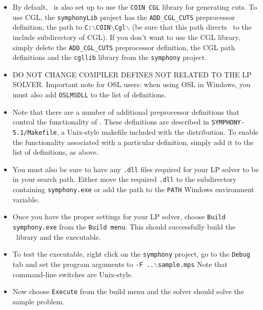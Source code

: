 \begin{itemize}
\begin{itemize}
\end{itemize}

\item By default, \BB\ is also set up to use the \texttt{COIN CGL} library for
generating cuts. To use CGL, the \texttt{symphonyLib} project has the
\texttt{ADD\_CGL\_CUTS} preprocessor definition, the path to
\texttt{C:$\backslash$COIN$\backslash$Cgl$\backslash$} (be sure that this path
directs \BB\ to the include subdirectory of CGL). If you don't want to use the 
CGL library, simply
delete the \texttt{ADD\_CGL\_CUTS} preprocessor definition, the CGL path
definitions and the \texttt{cgllib} library from the \texttt{symphony}
project.

\item DO NOT CHANGE COMPILER DEFINES NOT RELATED TO THE LP SOLVER. Important 
note for OSL users: when using OSL in Windows, you must also add 
\texttt{OSLMSDLL} to the list of definitions.

\item Note that there are a number of additional preprocessor definitions that
control the functionality of \BB. These definitions are described in
\texttt{SYMPHONY-5.1/Makefile}, a Unix-style makefile included with the
distribution. To enable the functionality associated with a particular
definition, simply add it to the list of definitions, as above.

\item You must also be sure to have any \texttt{.dll} files required for your
LP solver to be in your search path. Either move the required \texttt{.dll} to
the subdirectory containing \texttt{symphony.exe} or add the path to the 
\texttt{PATH} Windows environment variable.

\item Once you have the proper settings for your LP solver, choose 
\texttt{Build symphony.exe} from the \texttt{Build menu}. This should 
successfully build the \BB\ library and the executable.

\item To test the executable, right click on the \texttt{symphony} project, go
to the \texttt{Debug} tab and set the program arguments to \texttt{-F
..$\backslash${sample.mps}} Note that command-line switches are Unix-style.

\item Now choose \texttt{Execute} from the build menu and the solver
should solve the sample problem.

\end{itemize}


